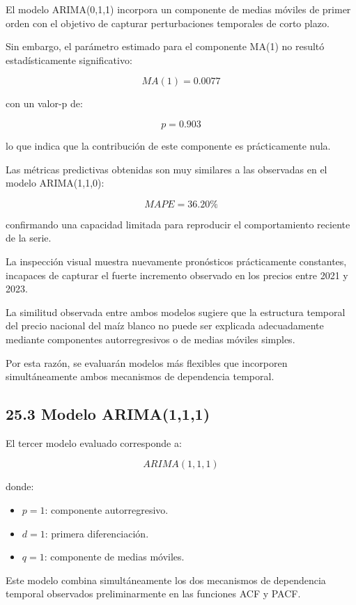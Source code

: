 \documentclass[11pt]{article}
\providecommand{\tightlist}{%
      \setlength{\itemsep}{0pt}\setlength{\parskip}{0pt}}
\begin{document}
El modelo ARIMA(0,1,1) incorpora un componente de medias móviles de
primer orden con el objetivo de capturar perturbaciones temporales de
corto plazo.

Sin embargo, el parámetro estimado para el componente MA(1) no resultó
estadísticamente significativo:

\[
MA(1)=0.0077
\]

con un valor-p de:

\[
p=0.903
\]

lo que indica que la contribución de este componente es prácticamente
nula.

Las métricas predictivas obtenidas son muy similares a las observadas en
el modelo ARIMA(1,1,0):

\[
MAPE = 36.20\%
\]

confirmando una capacidad limitada para reproducir el comportamiento
reciente de la serie.

La inspección visual muestra nuevamente pronósticos prácticamente
constantes, incapaces de capturar el fuerte incremento observado en los
precios entre 2021 y 2023.

La similitud observada entre ambos modelos sugiere que la estructura
temporal del precio nacional del maíz blanco no puede ser explicada
adecuadamente mediante componentes autorregresivos o de medias móviles
simples.

Por esta razón, se evaluarán modelos más flexibles que incorporen
simultáneamente ambos mecanismos de dependencia temporal.

    \hypertarget{modelo-arima111}{%
\subsection{25.3 Modelo ARIMA(1,1,1)}\label{modelo-arima111}}

El tercer modelo evaluado corresponde a:

\[
ARIMA(1,1,1)
\]

donde:

\begin{itemize}
\tightlist
\item
  \(p=1\): componente autorregresivo.
\item
  \(d=1\): primera diferenciación.
\item
  \(q=1\): componente de medias móviles.
\end{itemize}

Este modelo combina simultáneamente los dos mecanismos de dependencia
temporal observados preliminarmente en las funciones ACF y PACF.
\end{document}
